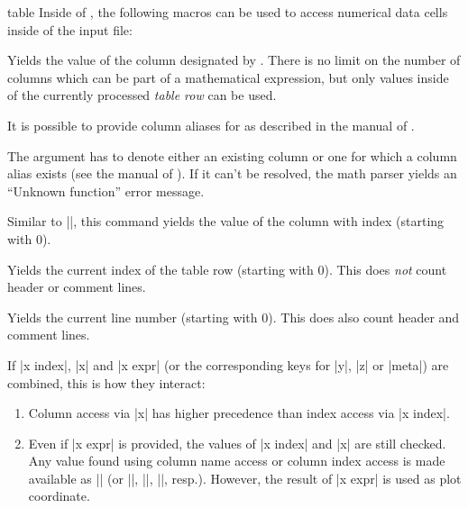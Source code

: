 {\begin{addplotoperation}[]{table}{}
    Inside of , the following macros can be used to access
    numerical data cells inside of the input file:

    \begin{command}{\thisrow{}}
        Yields the value of the column designated by . There
        is no limit on the number of columns which can be part of a
        mathematical expression, but only values inside of the currently
        processed \emph{table row} can be used.

        It is possible to provide column aliases for  as
        described in the manual of \PGFPlotstable{}.

        The argument  has to denote either an existing column
        or one for which a column alias exists (see the manual of
        \PGFPlotstable). If it can't be resolved, the math parser yields an
        ``Unknown function'' error message.
    \end{command}

    \begin{command}{\thisrowno{}}
        Similar to |\thisrow|, this command yields the value of the column with
        index  (starting with $0$).
    \end{command}

    \begin{command}{\coordindex}
        Yields the current index of the table row (starting with $0$). This does
        \emph{not} count header or comment lines.
    \end{command}

    \begin{command}{\lineno}
        Yields the current line number (starting with $0$). This does also
        count header and comment lines.
    \end{command}

    If |x index|, |x| and |x expr| (or the corresponding keys for |y|, |z| or
    |meta|) are combined, this is how they interact:
    \begin{enumerate}
        \item Column access via |x| has higher precedence than index access
            via |x index|.
        \item Even if |x expr| is provided, the values of |x index| and |x|
            are still checked. Any value found using column name access or
            column index access is made available as |\columnx| (or
            |\columny|, |\columnz|, |\columnmeta|, resp.). However, the
            result of |x expr| is used as plot coordinate.


\end{enumerate}
\end{addplotoperation}}
